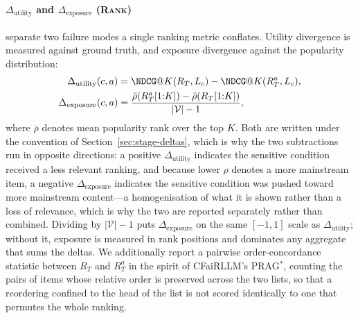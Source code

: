 \documentclass[manuscript,screen,review]{acmart}
\newcommand{\Dutility}{\Delta_{\mathrm{utility}}}
\newcommand{\Dexposure}{\Delta_{\mathrm{exposure}}}
\newcommand{\stage}[1]{\textsc{#1}}
\begin{document}
\paragraph{$\Dutility$ and $\Dexposure$ (\stage{Rank})}
separate two failure modes a single ranking metric conflates. Utility divergence
is measured against ground truth, and exposure divergence against the popularity
distribution:
\begin{align}
  \Dutility(c, a) &= \NDCG@K(R_T, L_c) - \NDCG@K(R^{a}_T, L_c),
  \label{eq:dutility}\\
  \Dexposure(c, a) &= \frac{\bar{\rho}\!\left(R^{a}_T[1{:}K]\right)
                     - \bar{\rho}\!\left(R_T[1{:}K]\right)}{|\mathcal{V}| - 1},
  \label{eq:dexposure}
\end{align}
where $\bar{\rho}$ denotes mean popularity rank over the top $K$. Both are written
under the convention of Section~\ref{sec:stage-deltas}, which is why the two
subtractions run in opposite directions: a positive $\Dutility$ indicates the
sensitive condition received a less relevant ranking, and because lower $\rho$
denotes a more mainstream item, a negative $\Dexposure$ indicates the sensitive
condition was pushed toward more mainstream content---a homogenisation of what it
is shown rather than a loss of relevance, which is why the two are reported
separately rather than combined. Dividing by $|\mathcal{V}| - 1$ puts $\Dexposure$
on the same $[-1,1]$ scale as $\Dutility$; without it, exposure is measured in rank
positions and dominates any aggregate that sums the deltas. We
additionally report a pairwise order-concordance statistic between $R_T$ and
$R^{a}_T$ in the spirit of CFaiRLLM's PRAG$^{*}$, counting the pairs of items
whose relative order is preserved across the two lists, so that a reordering
confined to the head of the list is not scored identically to one that permutes
the whole ranking.
\end{document}
